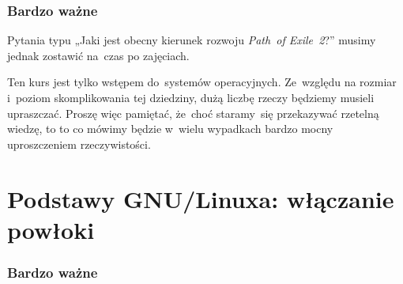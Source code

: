 \documentclass[10pt,t]{beamer}
\begin{document}
\begin{frame}
  \frametitle{Bardzo ważne}


  Pytania typu „Jaki jest obecny kierunek rozwoju \textit{Path~of
    Exile~2}?” musimy jednak zostawić na~czas po zajęciach.

  Ten kurs jest tylko \alert{wstępem} do~systemów operacyjnych. Ze~względu
  na rozmiar i~poziom skomplikowania tej dziedziny, dużą liczbę rzeczy
  będziemy musieli \alert{upraszczać}. Proszę więc pamiętać, że~choć
  staramy~się przekazywać rzetelną wiedzę, to to co mówimy będzie w~wielu
  wypadkach bardzo mocny uproszczeniem rzeczywistości.

\end{frame}










\section{Podstawy GNU/Linuxa: włączanie powłoki}


\begin{frame}
  \frametitle{Bardzo ważne}




\end{frame}
\end{document}
